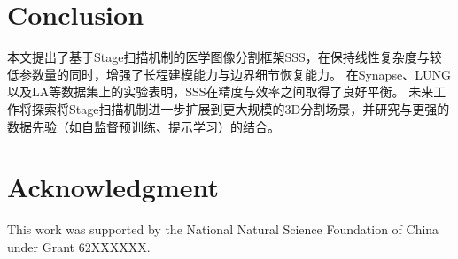 \documentclass[conference]{IEEEtran}   %
\begin{document}


\section{Conclusion}
本文提出了基于Stage扫描机制的医学图像分割框架SSS，在保持线性复杂度与较低参数量的同时，增强了长程建模能力与边界细节恢复能力。
在Synapse、LUNG以及LA等数据集上的实验表明，SSS在精度与效率之间取得了良好平衡。
未来工作将探索将Stage扫描机制进一步扩展到更大规模的3D分割场景，并研究与更强的数据先验（如自监督预训练、提示学习）的结合。

\section*{Acknowledgment}
This work was supported by the National Natural Science Foundation of China under Grant 62XXXXXX.
\end{document}
